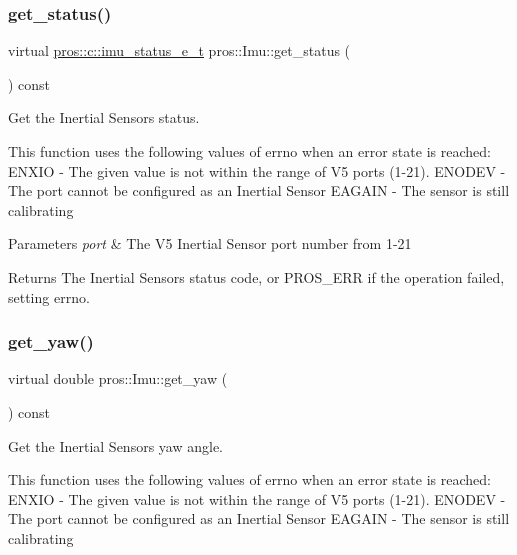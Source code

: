 \subsubsection{\texorpdfstring{get\+\_\+status()}{get\_status()}}
{\footnotesize\ttfamily virtual \hyperlink{imu_8h_a7d3682de24c3a459dddda55d65793309}{pros\+::c\+::imu\+\_\+status\+\_\+e\+\_\+t} pros\+::\+Imu\+::get\+\_\+status (\begin{DoxyParamCaption}{ }\end{DoxyParamCaption}) const\hspace{0.3cm}{\ttfamily [virtual]}}



Get the Inertial Sensor\textquotesingle{}s status. 

This function uses the following values of errno when an error state is reached\+: E\+N\+X\+IO -\/ The given value is not within the range of V5 ports (1-\/21). E\+N\+O\+D\+EV -\/ The port cannot be configured as an Inertial Sensor E\+A\+G\+A\+IN -\/ The sensor is still calibrating


\begin{DoxyParams}{Parameters}
{\em port} & The V5 Inertial Sensor port number from 1-\/21 \\
\hline
\end{DoxyParams}
\begin{DoxyReturn}{Returns}
The Inertial Sensor\textquotesingle{}s status code, or P\+R\+O\+S\+\_\+\+E\+RR if the operation failed, setting errno. 
\end{DoxyReturn}
\mbox{\label{classpros_1_1Imu_aa2dd2dec5b1a91d4358c23afd8f0f1bd}} 
\subsubsection{\texorpdfstring{get\+\_\+yaw()}{get\_yaw()}}
{\footnotesize\ttfamily virtual double pros\+::\+Imu\+::get\+\_\+yaw (\begin{DoxyParamCaption}{ }\end{DoxyParamCaption}) const\hspace{0.3cm}{\ttfamily [virtual]}}



Get the Inertial Sensor\textquotesingle{}s yaw angle. 

This function uses the following values of errno when an error state is reached\+: E\+N\+X\+IO -\/ The given value is not within the range of V5 ports (1-\/21). E\+N\+O\+D\+EV -\/ The port cannot be configured as an Inertial Sensor E\+A\+G\+A\+IN -\/ The sensor is still calibrating



